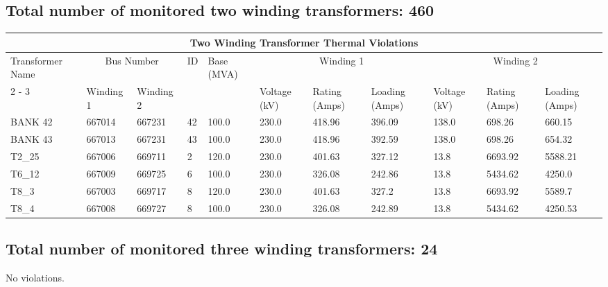 \documentclass{article}%
\begin{document}
\subsection*{Total number of monitored two winding transformers: 460}%
\label{subsec:Totalnumberofmonitoredtwowindingtransformers460}%
\begin{tabularx}{\textwidth}{| p{1.7cm} | X | X |p{0.3cm} | X | X | X | X | X | X | X |}%
\hline%
\multicolumn{11}{|c|}{Two Winding Transformer Thermal Violations}\\%
\hline%
Transformer Name&\multicolumn{2}{|c|}{Bus Number}&ID&Base (MVA)&\multicolumn{3}{|c|}{Winding 1}&\multicolumn{3}{|c|}{Winding 2}\\%
\cline{2%
-%
3}%
\cline{6%
-%
11}%
&Winding 1&Winding 2&&&Voltage (kV)&Rating (Amps)&Loading (Amps)&Voltage (kV)&Rating (Amps)&Loading (Amps)\\%
\hline%
BANK 42&667014&667231&42&100.0&230.0&418.96&396.09&138.0&698.26&660.15\\%
\hline%
\hline%
BANK 43&667013&667231&43&100.0&230.0&418.96&392.59&138.0&698.26&654.32\\%
\hline%
\hline%
T2\_25&667006&669711&2&120.0&230.0&401.63&327.12&13.8&6693.92&5588.21\\%
\hline%
\hline%
T6\_12&667009&669725&6&100.0&230.0&326.08&242.86&13.8&5434.62&4250.0\\%
\hline%
\hline%
T8\_3&667003&669717&8&120.0&230.0&401.63&327.2&13.8&6693.92&5589.7\\%
\hline%
\hline%
T8\_4&667008&669727&8&100.0&230.0&326.08&242.89&13.8&5434.62&4250.53\\%
\hline%
\end{tabularx}

%
\subsection*{Total number of monitored three winding transformers: 24}%
\label{subsec:Totalnumberofmonitoredthreewindingtransformers24}%
No violations.

%
\end{document}
